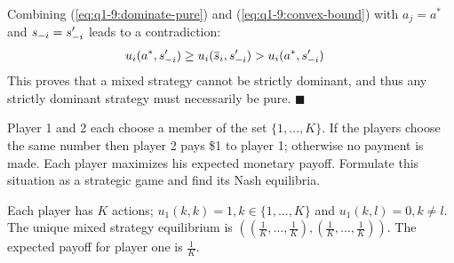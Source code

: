 \documentclass[../main.tex]{subfiles}
\begin{document}
\begin{solution}
	Combining (\ref{eq:q1-9:dominate-pure}) and (\ref{eq:q1-9:convex-bound}) with $a_j = a^*$ and $s_{\--i} = s'_{\--i}$ leads to a contradiction:
	\begin{align}
		u_i(a^*, s'_{\--i}) &\geq u_i(\overline{s}_i, s'_{\--i}) > u_i(a^*, s'_{\--i})
	\end{align}
	This proves that a mixed strategy cannot be strictly dominant, and thus any strictly dominant strategy must necessarily be pure. $\blacksquare$

\end{solution}

\begin{question}
	

	Player 1 and 2 each choose a member of the set $\{1,\ldots,K\}$. If the players choose the same number then player 2 pays \$1 to player 1; otherwise no payment is made. Each player maximizes his expected monetary payoff. Formulate this situation as a strategic game and find its Nash equilibria.
\end{question}

\begin{solution}
Each player has $K$ actions; $u_1(k,k) = 1, k \in \{1,..., K\}$ and $u_1(k, l) = 0, k \neq l$. The unique mixed strategy equilibrium is $((\frac{1}{K},...,\frac{1}{K}),(\frac{1}{K},...,\frac{1}{K}))$. The expected payoff for player one is $\frac{1}{K}$.

\end{solution}
\end{document}
